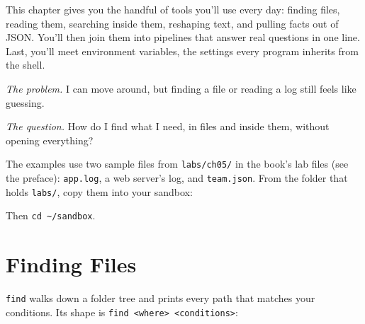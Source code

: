 
\begin{chapterintro}

This chapter gives you the handful of tools you'll use every day: finding files, reading them, searching inside them, reshaping text, and pulling facts out of JSON. You'll then join them into pipelines that answer real questions in one line. Last, you'll meet environment variables, the settings every program inherits from the shell.

\end{chapterintro}

\emph{The problem.} I can move around, but finding a file or reading a log still feels like guessing.

\emph{The question.} How do I find what I need, in files and inside them, without opening everything?


The examples use two sample files from \texttt{labs/ch05/} in the book's lab files (see the preface): \texttt{app.log}, a web server's log, and \texttt{team.json}. From the folder that holds \texttt{labs/}, copy them into your sandbox:

\begin{codeblock}

\begin{Shaded}
\begin{Highlighting}[]
 
\end{Highlighting}
\end{Shaded}

\end{codeblock}

Then \texttt{cd\ \textasciitilde{}/sandbox}.

\section{Finding Files}\label{05-the-everyday-command-line:finding-files}

\texttt{find} walks down a folder tree and prints every path that matches your conditions. Its shape is \texttt{find\ \textless{}where\textgreater{}\ \textless{}conditions\textgreater{}}:

